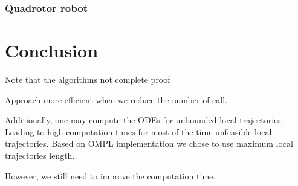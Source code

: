 \subsubsection{Quadrotor robot}

\section{Conclusion}\label{sec:concl}
Note that the algorithms not complete proof

Approach more efficient when we reduce the number of call. 

Additionally, one may compute the ODEs for unbounded local trajectories. 
Leading to high computation times for most of the time unfeasible local trajectories. 
Based on OMPL implementation we chose to use maximum local trajectories length.

However, we still need to improve the computation time.
